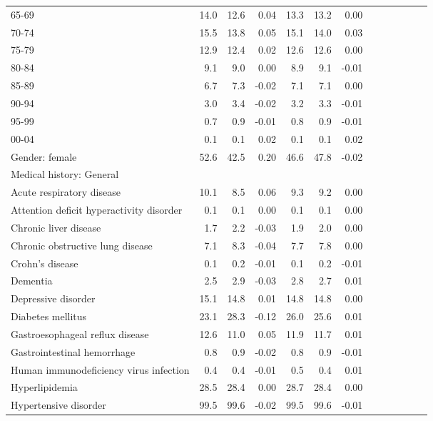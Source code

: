 \documentclass[11pt,]{article}
\begin{document}
\begin{longtable}{lrrrrrrrrrrrr}
      65-69 &  14.0 &  12.6 &  0.04 &  13.3 &  13.2 &  0.00 \\ 
      70-74 &  15.5 &  13.8 &  0.05 &  15.1 &  14.0 &  0.03 \\ 
      75-79 &  12.9 &  12.4 &  0.02 &  12.6 &  12.6 &  0.00 \\ 
      80-84 &   9.1 &   9.0 &  0.00 &   8.9 &   9.1 & -0.01 \\ 
      85-89 &   6.7 &   7.3 & -0.02 &   7.1 &   7.1 &  0.00 \\ 
      90-94 &   3.0 &   3.4 & -0.02 &   3.2 &   3.3 & -0.01 \\ 
      95-99 &   0.7 &   0.9 & -0.01 &   0.8 &   0.9 & -0.01 \\ 
      00-04 &   0.1 &   0.1 &  0.02 &   0.1 &   0.1 &  0.02 \\ 
  Gender: female &  52.6 &  42.5 &  0.20 &  46.6 &  47.8 & -0.02 \\ 
  Medical history: General &     &     &     &     &     &     \\ 
      Acute respiratory disease &  10.1 &   8.5 &  0.06 &   9.3 &   9.2 &  0.00 \\ 
      Attention deficit hyperactivity disorder &   0.1 &   0.1 &  0.00 &   0.1 &   0.1 &  0.00 \\ 
      Chronic liver disease &   1.7 &   2.2 & -0.03 &   1.9 &   2.0 &  0.00 \\ 
      Chronic obstructive lung disease &   7.1 &   8.3 & -0.04 &   7.7 &   7.8 &  0.00 \\ 
      Crohn's disease &   0.1 &   0.2 & -0.01 &   0.1 &   0.2 & -0.01 \\ 
      Dementia &   2.5 &   2.9 & -0.03 &   2.8 &   2.7 &  0.01 \\ 
      Depressive disorder &  15.1 &  14.8 &  0.01 &  14.8 &  14.8 &  0.00 \\ 
      Diabetes mellitus &  23.1 &  28.3 & -0.12 &  26.0 &  25.6 &  0.01 \\ 
      Gastroesophageal reflux disease &  12.6 &  11.0 &  0.05 &  11.9 &  11.7 &  0.01 \\ 
      Gastrointestinal hemorrhage &   0.8 &   0.9 & -0.02 &   0.8 &   0.9 & -0.01 \\ 
      Human immunodeficiency virus infection &   0.4 &   0.4 & -0.01 &   0.5 &   0.4 &  0.01 \\ 
      Hyperlipidemia &  28.5 &  28.4 &  0.00 &  28.7 &  28.4 &  0.00 \\ 
      Hypertensive disorder &  99.5 &  99.6 & -0.02 &  99.5 &  99.6 & -0.01 \\ 

\end{longtable}
\end{document}
